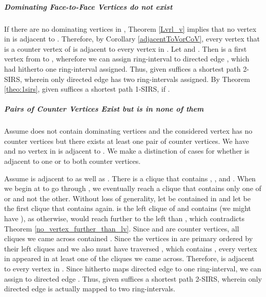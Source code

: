 \documentclass[10pt]{article}
\begin{document}
\subparagraph{Dominating Face-to-Face Vertices  do not exist}

If there are no dominating vertices in , Theorem \ref{Lvrl_v} implies that no vertex in  is adjacent to .
Therefore, by Corollary \ref{adjacentToVorCoV}, every vertex that
is a counter vertex of  is adjacent to every vertex in .
Let  and .
Then  is a first vertex 
from  to , wherefore we can assign ring-interval  to 
directed edge , which had hitherto one ring-interval assigned.
Thus,  given  suffices a shortest path 2-SIRS, wherein only directed edge  has two ring-intervals assigned.
By Theorem \ref{theo:1sirs},  given  suffices a 
shortest path 1-SIRS, if .





\subparagraph{Pairs of Counter Vertices Exist but  is in none of them}\label{counteratall}

Assume  does not contain dominating 
vertices and the considered vertex   has no counter vertices but 
there exists at least one pair  of counter vertices.
We have  and 
no vertex in  is adjacent to .
We make a distinction of cases for whether  is adjacent to one or to both counter vertices.


Assume  is adjacent to  as well as .
There is a clique  that contains , , and .
When we begin at  to go through ,
we eventually reach a clique  that contains only one of  or 
and not the other.
Without loss of generality, let  be contained in  and let  be the first clique that contains  again.
 is the left clique of  and 
contains  (we might have ), as
otherwise,  would reach further to the left than , 
which contradicts Theorem \ref{no_vertex_further_than_lv}.
Since  and  are counter vertices, all cliques we came across contained .
Since the vertices in  are primary ordered by their 
left cliques and we also must have traversed , which contains , every vertex in 
 appeared in at least one of the cliques we came across.
Therefore,  is adjacent to every vertex in .
Since  hitherto maps directed edge  to one ring-interval, we can assign  to directed edge . 
Thus,  given  suffices a shortest path 2-SIRS, wherein only directed edge  is 
actually mapped to two ring-intervals.
\end{document}
